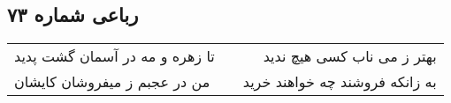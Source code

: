 \begin{center}
\section*{رباعی شماره ۷۳}
\label{sec:sh073}
\begin{longtable}{l p{0.5cm} r}
تا زهره و مه در آسمان گشت پدید
&&
بهتر ز می ناب کسی هیچ ندید
\\
من در عجبم ز میفروشان کایشان
&&
به زانکه فروشند چه خواهند خرید
\\
\end{longtable}
\end{center}
